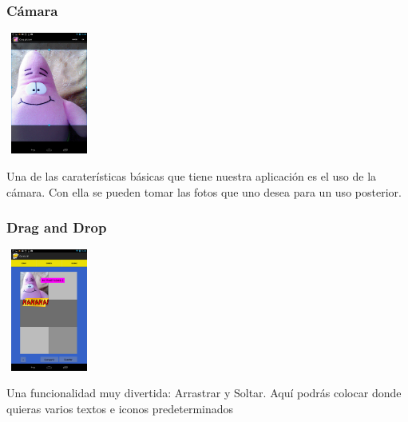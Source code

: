 \documentclass[utf8]{beamer}
\begin{document}
\begin{frame}
  \frametitle{Cámara}
 

  	\begin{center}
		\begingroup
			\includegraphics[height=4cm,width=2.8205cm]{imagenes/camaraft1.png}
		\endgroup
	\end{center}

  \begin{block}{}
Una de las caraterísticas básicas que tiene nuestra aplicación es el uso de la cámara. Con ella se pueden tomar las fotos que uno desea para un uso posterior.
  \end{block}

\end{frame}





\begin{frame}
  \frametitle{Drag and Drop}
 

  	\begin{center}
		\begingroup
			\includegraphics[height=4cm,width=2.8205cm]{imagenes/drag.png}
		\endgroup
	\end{center}

  \begin{block}{}
Una funcionalidad muy divertida: Arrastrar y Soltar. Aquí podrás colocar donde quieras varios textos e iconos predeterminados 
  \end{block}

\end{frame}
\end{document}
